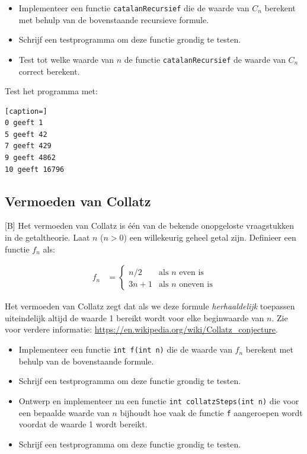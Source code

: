 \documentclass[a4paper,10pt,fleqn,twoside]{article}
\begin{document}
\begin{itemize}
\item Implementeer een functie \lstinline|catalanRecursief| die de waarde van $C_n$ berekent met behulp van de bovenstaande recursieve formule.
\item Schrijf een testprogramma om deze functie grondig te testen.
\item Test tot welke waarde van $n$ de functie \lstinline|catalanRecursief| de waarde van $C_n$ correct berekent.
\end{itemize}

Test het programma met:

\begin{lstlisting}[caption=]
0 geeft 1
5 geeft 42
7 geeft 429
9 geeft 4862
10 geeft 16796
\end{lstlisting}

\subsection{Vermoeden van Collatz}[B]
Het vermoeden van Collatz is één van de bekende onopgeloste vraagstukken in de getaltheorie.
Laat $n$ ($n>0$) een willekeurig geheel getal zijn. Definieer een functie $f_n$ als:

\begin{align*}
f_n &= \begin{cases}
n/2 &\text{als } n \text{ even is} \\
3n+1 &\text{als } n \text{ oneven is}
\end{cases}
\end{align*}

Het vermoeden van Collatz zegt dat als we deze formule \textsl{herhaaldelijk} toepassen uiteindelijk altijd de waarde 1 bereikt wordt voor elke beginwaarde van $n$. Zie voor verdere informatie: \url{https://en.wikipedia.org/wiki/Collatz_conjecture}. 

\begin{itemize}
\item Implementeer een functie \lstinline|int f(int n)| die de waarde van $f_n$ berekent met behulp van de bovenstaande formule.
\item Schrijf een testprogramma om deze functie grondig te testen.
\item Ontwerp en implementeer nu een functie \lstinline|int collatzSteps(int n)| die voor een bepaalde waarde van $n$ bijhoudt hoe vaak de functie \lstinline|f| aangeroepen wordt voordat de waarde 1 wordt bereikt.
\item Schrijf een testprogramma om deze functie grondig te testen.
\end{itemize}
\end{document}
